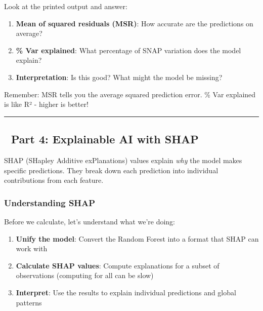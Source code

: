 \documentclass[
  letterpaper,
  DIV=11,
  numbers=noendperiod]{scrartcl}
\providecommand{\tightlist}{%
  \setlength{\itemsep}{0pt}\setlength{\parskip}{0pt}}\usepackage{longtable,booktabs,array}
\begin{document}
\begin{tcolorbox}[enhanced jigsaw, title=\textcolor{quarto-callout-note-color}{\faInfo}\hspace{0.5em}{🔍 Understanding Your Model Output}, titlerule=0mm, coltitle=black, colbacktitle=quarto-callout-note-color!10!white, colback=white, left=2mm, toprule=.15mm, opacitybacktitle=0.6, toptitle=1mm, colframe=quarto-callout-note-color-frame, bottomtitle=1mm, arc=.35mm, bottomrule=.15mm, breakable, leftrule=.75mm, opacityback=0, rightrule=.15mm]

Look at the printed output and answer:

\begin{enumerate}
\def\labelenumi{\arabic{enumi}.}
\tightlist
\item
  \textbf{Mean of squared residuals (MSR)}: How accurate are the
  predictions on average?
\item
  \textbf{\% Var explained}: What percentage of SNAP variation does the
  model explain?
\item
  \textbf{Interpretation}: Is this good? What might the model be
  missing?
\end{enumerate}

Remember: MSR tells you the average squared prediction error. \% Var
explained is like R² - higher is better!

\end{tcolorbox}

\begin{center}\rule{0.5\linewidth}{0.5pt}\end{center}

\subsection{🔬 Part 4: Explainable AI with
SHAP}\label{part-4-explainable-ai-with-shap}

SHAP (SHapley Additive exPlanations) values explain \emph{why} the model
makes specific predictions. They break down each prediction into
individual contributions from each feature.

\subsubsection{Understanding SHAP}\label{understanding-shap}

Before we calculate, let's understand what we're doing:

\begin{enumerate}
\def\labelenumi{\arabic{enumi}.}
\tightlist
\item
  \textbf{Unify the model}: Convert the Random Forest into a format that
  SHAP can work with
\item
  \textbf{Calculate SHAP values}: Compute explanations for a subset of
  observations (computing for all can be slow)
\item
  \textbf{Interpret}: Use the results to explain individual predictions
  and global patterns
\end{enumerate}
\end{document}
